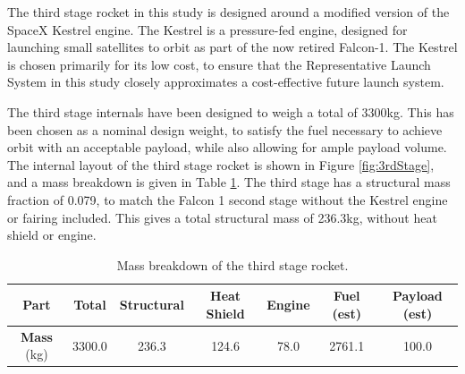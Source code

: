   The third stage rocket in this study is designed around a modified version of the SpaceX Kestrel engine. The Kestrel is a pressure-fed engine, designed for launching small satellites to orbit as part of the now retired Falcon-1. The Kestrel is chosen primarily for its low cost, to ensure that the Representative Launch System in this study closely approximates a cost-effective future launch system.  
  
  
 The third stage internals have been designed to weigh a total of 3300kg. This has been chosen as a nominal design weight, to satisfy the fuel necessary to achieve orbit with an acceptable payload, while also allowing for ample payload volume. The internal layout of the third stage rocket is shown in Figure \ref{fig:3rdStage}, and a mass breakdown is given in Table \ref{tab:MassBreakdown3}. The third stage has a structural mass fraction of 0.079, to match the Falcon 1 second stage without the Kestrel engine or fairing included\cite{Vehicle2008}. This gives a total structural mass of 236.3kg, without heat shield or engine. 
 

 
	\begin{table}[h]
		\centering
		\begin{tabular}{|c|c|c|c|c|c|c|}
			\hline  \textbf{Part} & Total & Structural & Heat Shield & Engine & Fuel (est) & Payload (est) \\ 
			\hline \textbf{Mass} (kg) & 3300.0  & 236.3  & 124.6  & 78.0  & 2761.1 & 100.0\\ 
			\hline 
		\end{tabular} 
		\caption{Mass breakdown of the third stage rocket.} %
		\label{tab:MassBreakdown3}
	\end{table}
 
 
 
 
